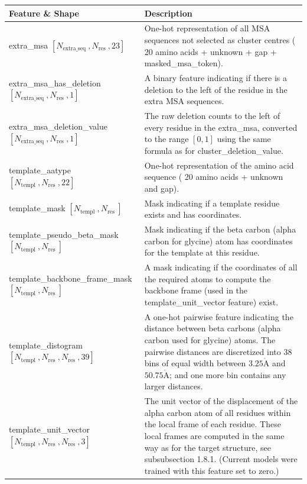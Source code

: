 \documentclass[10pt]{article}
\def\AA{\mathring{\mathrm{A}}}
\begin{document}
\begin{center}
\begin{tabular}{|l|l|}
\hline
Feature \& Shape & Description \\
\hline
extra\_msa $\left[N_{\text {extra_seq }}, N_{\text {res }}, 23\right]$ & One-hot representation of all MSA sequences not selected as cluster centres ( 20 amino acids + unknown + gap + masked\_msa\_token). \\
\hline
extra\_msa\_has\_deletion $\left[N_{\text {extra_seq }}, N_{\text {res }}, 1\right]$ & A binary feature indicating if there is a deletion to the left of the residue in the extra MSA sequences. \\
\hline
extra\_msa\_deletion\_value $\left[N_{\text {extra_seq }}, N_{\text {res }}, 1\right]$ & The raw deletion counts to the left of every residue in the extra\_msa, converted to the range $[0,1]$ using the same formula as for cluster\_deletion\_value. \\
\hline
template\_aatype $\left[N_{\text {templ }}, N_{\text {res }}, 22\right]$ & One-hot representation of the amino acid sequence ( 20 amino acids + unknown and gap). \\
\hline
template\_mask $\left[N_{\text {templ }}, N_{\text {res }}\right]$ & Mask indicating if a template residue exists and has coordinates. \\
\hline
template\_pseudo\_beta\_mask $\left[N_{\text {templ }}, N_{\text {res }}\right]$ & Mask indicating if the beta carbon (alpha carbon for glycine) atom has coordinates for the template at this residue. \\
\hline
template\_backbone\_frame\_mask $\left[N_{\text {templ }}, N_{\text {res }}\right]$ & A mask indicating if the coordinates of all the required atoms to compute the backbone frame (used in the template\_unit\_vector feature) exist. \\
\hline
template\_distogram $\left[N_{\text {templ }}, N_{\text {res }}, N_{\text {res }}, 39\right]$ & A one-hot pairwise feature indicating the distance between beta carbons (alpha carbon used for glycine) atoms. The pairwise distances are discretized into 38 bins of equal width between $3.25 \AA$ and $50.75 \AA$; and one more bin contains any larger distances. \\
\hline
template\_unit\_vector $\left[N_{\text {templ }}, N_{\text {res }}, N_{\text {res }}, 3\right]$ & The unit vector of the displacement of the alpha carbon atom of all residues within the local frame of each residue. These local frames are computed in the same way as for the target structure, see subsubsection 1.8.1. (Current models were trained with this feature set to zero.) \\

\end{tabular}
\end{center}
\end{document}
